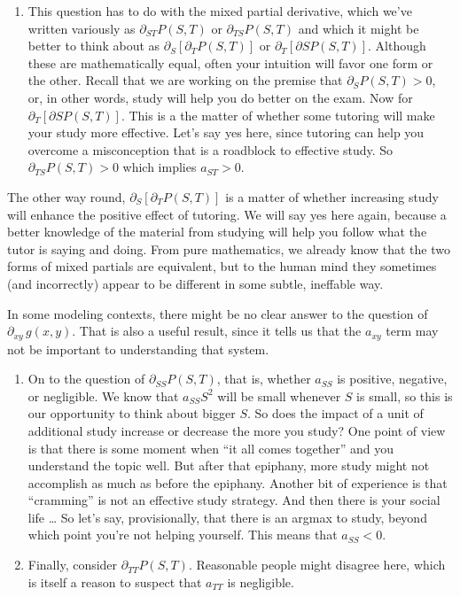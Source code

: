 \documentclass[
  letterpaper,
  DIV=11,
  numbers=noendperiod,
  oneside]{scrreprt}
\providecommand{\tightlist}{%
  \setlength{\itemsep}{0pt}\setlength{\parskip}{0pt}}
\begin{document}
\begin{enumerate}
\def\labelenumi{\arabic{enumi}.}
\setcounter{enumi}{2}
\tightlist
\item
  This question has to do with the mixed partial derivative, which we've
  written variously as \(\partial_{ST} P(S,T)\) or
  \(\partial_{TS} P(S,T)\) and which it might be better to think about
  as \(\partial_S \left[\partial_T P(S,T) \right]\) or
  \(\partial_T \left[\partial S P(S,T)\right]\). Although these are
  mathematically equal, often your intuition will favor one form or the
  other. Recall that we are working on the premise that
  \(\partial_S P(S,T) > 0\), or, in other words, study will help you do
  better on the exam. Now for
  \(\partial_T \left[\partial S P(S,T)\right]\). This is a the matter of
  whether some tutoring will make your study more effective. Let's say
  yes here, since tutoring can help you overcome a misconception that is
  a roadblock to effective study. So \(\partial_{TS} P(S,T) > 0\) which
  implies \(a_{ST} > 0\).
\end{enumerate}

The other way round, \(\partial_S \left[\partial_T P(S,T) \right]\) is a
matter of whether increasing study will enhance the positive effect of
tutoring. We will say yes here again, because a better knowledge of the
material from studying will help you follow what the tutor is saying and
doing. From pure mathematics, we already know that the two forms of
mixed partials are equivalent, but to the human mind they sometimes (and
incorrectly) appear to be different in some subtle, ineffable way.

In some modeling contexts, there might be no clear answer to the
question of \(\partial_{xy}\, g(x,y)\). That is also a useful result,
since it tells us that the \(a_{xy}\) term may not be important to
understanding that system.

\begin{enumerate}
\def\labelenumi{\arabic{enumi}.}
\setcounter{enumi}{3}
\item
  On to the question of \(\partial_{SS} P(S,T)\), that is, whether
  \(a_{SS}\) is positive, negative, or negligible. We know that
  \(a_{SS} S^2\) will be small whenever \(S\) is small, so this is our
  opportunity to think about bigger \(S\). So does the impact of a unit
  of additional study increase or decrease the more you study? One point
  of view is that there is some moment when ``it all comes together''
  and you understand the topic well. But after that epiphany, more study
  might not accomplish as much as before the epiphany. Another bit of
  experience is that ``cramming'' is not an effective study strategy.
  And then there is your social life \ldots{} So let's say,
  provisionally, that there is an argmax to study, beyond which point
  you're not helping yourself. This means that \(a_{SS} < 0\).
\item
  Finally, consider \(\partial_{TT} P(S, T)\). Reasonable people might
  disagree here, which is itself a reason to suspect that \(a_{TT}\) is
  negligible.
\end{enumerate}
\end{document}

